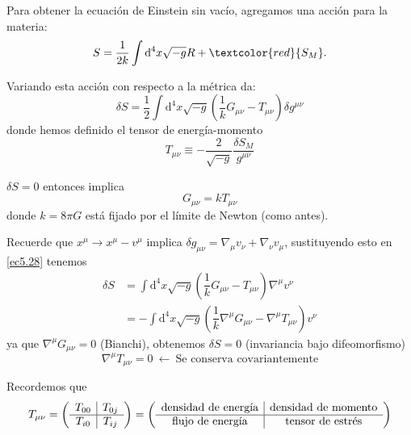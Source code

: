 \documentclass[../main]{subfiles}
\begin{document}
\begin{adjustwidth}{0pt}{-100pt}
Para obtener la ecuación de Einstein sin vacío, agregamos una acción para la materia:
\begin{equation}
    S=\dfrac{1}{2k}\int \mathrm{d}^4 x \sqrt{-g}R+\textcolor{red}{S_M}.
\end{equation} 

Variando esta acción con respecto a la métrica da:
\begin{equation}
    \delta S = \dfrac{1}{2}\int \mathrm{d}^4 x \sqrt{-g}\left(\dfrac{1}{k}G_{\mu\nu}-T_{\mu\nu}\right)\delta g^{\mu\nu}
    \label{ec5.28}
\end{equation}
donde hemos definido el tensor de energía-momento
\begin{equation}
    T_{\mu\nu}\equiv -\dfrac{2}{\sqrt{-g}}\dfrac{\delta S_M}{g^{\mu\nu}}
\end{equation}

$\delta S=0$ entonces implica 
\begin{equation}
    G_{\mu\nu} = k T_{\mu\nu}
\end{equation}
donde $k=8\pi G$ está fijado por el límite de Newton (como antes).

Recuerde que $x^{\mu} \rightarrow x^{\mu}-v^{\mu}$ implica $\delta g_{\mu\nu}=\nabla_{\mu}v_{\nu}+\nabla_{\nu}v_{\mu}$, sustituyendo esto en \eqref{ec5.28} tenemos
\begin{equation}
    \begin{split}
        \delta S &= \int \mathrm{d}^4 x \sqrt{-g}\left(\dfrac{1}{k}G_{\mu\nu}-T_{\mu\nu}\right)\nabla^{\mu}v^{\nu}\\
        &= - \int \mathrm{d}^4 x \sqrt{-g}\left(\dfrac{1}{k}\nabla^{\mu}G_{\mu\nu}-\nabla^{\mu}T_{\mu\nu}\right)v^{\nu}
    \end{split}
\end{equation}
ya que $\nabla^{\mu} G_{\mu\nu}=0$ (Bianchi), obtenemos $\delta S=0$ (invariancia bajo difeomorfismo)
\begin{equation}
    \nabla^{\mu}T_{\mu\nu}=0 \ \leftarrow \ \text{Se conserva covariantemente}
\end{equation}

Recordemos que 
\begin{equation}
    T_{\mu\nu}=
    \mleft(
    \begin{array}{c|c}
        T_{00} & T_{0j} \\ \hline
        T_{i0} & T_{ij}
    \end{array}
    \mright)
    =
    \mleft(
    \begin{array}{c|c}
        \text{densidad de energía} & \text{densidad de momento} \\ \hline
        \text{flujo de energía} & \text{tensor de estrés}
    \end{array}
    \mright)
\end{equation}


\end{adjustwidth}
\end{document}
